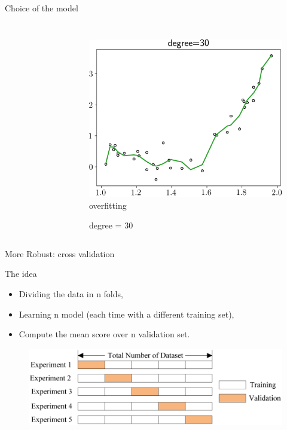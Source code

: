 \documentclass[handout]{beamer}
\begin{document}
\begin{frame}{Choice of the model}
\begin{columns}
\begin{figure}
    \end{figure}
    \begin{figure}
    \caption*{degree = 30 }
    \includegraphics[width=\textwidth]{fig/L1/interp-pol-30.png}\\
        overfitting

    \end{figure}
 
\end{columns}

\end{frame}



\begin{frame}{More Robust: cross validation}
    \begin{block}{The idea}
    \begin{itemize}
\item Dividing the data in n folds, 
\item Learning n model (each time with a different training set),
\item Compute the mean score over n validation set.
\end{itemize}
\end{block}
   \begin{figure}
    \includegraphics[width=\textwidth]{fig/L1/cv.png}
    \end{figure}

\end{frame}
\end{document}
